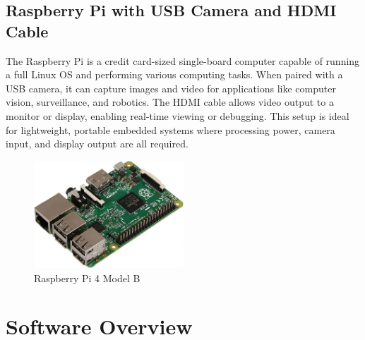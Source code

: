 \subsection{Raspberry Pi with USB Camera and HDMI Cable}
The Raspberry Pi is a credit card-sized single-board computer capable of running a full Linux OS and performing various computing tasks. When paired with a USB camera, it can capture images and video for applications like computer vision, surveillance, and robotics. The HDMI cable allows video output to a monitor or display, enabling real-time viewing or debugging. This setup is ideal for lightweight, portable embedded systems where processing power, camera input, and display output are all required.
\begin{figure}
\centering
\includegraphics[width=0.5\textwidth]{images/raspimg.jpg}
\caption{Raspberry Pi 4 Model B}

\end{figure}

\section{Software Overview}

